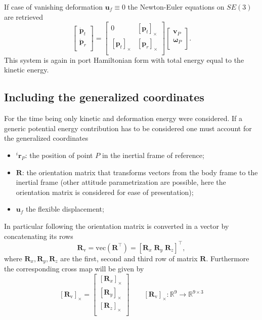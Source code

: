 \documentclass{svjour3}                     %
\newcommand{\crmat}[1]{\ensuremath{[#1]_{\times}}}
\begin{document}
\begin{remark}
If case of vanishing deformation $\bm{u}_f \equiv 0$ the Newton-Euler equations on $SE(3)$ are retrieved
\begin{equation}
\begin{bmatrix}
\dot{\bm{p}}_t \\ \dot{\bm{p}}_r \\
\end{bmatrix} = 
\begin{bmatrix}
	0 & \crmat{\bm{p}_t}\\
	\crmat{\bm{p}_t} & \crmat{\bm{p}_r} \\
	\end{bmatrix}
\begin{bmatrix}
\bm{v}_P \\ \bm{\omega}_P  \\
\end{bmatrix}.
\end{equation}
This system is again in port Hamiltonian form with total energy equal to the kinetic energy.
\end{remark}
\subsection{Including the generalized coordinates}
For the time being only kinetic and deformation energy were considered. If a generic potential energy contribution has to be considered one must account for the generalized coordinates
\begin{itemize}
	\item $^i \bm{r}_P$: the position of point $P$ in the inertial frame of reference;
	\item $\bm{R}$: the orientation matrix that transforms vectors from the body frame to the inertial frame (other attitude parametrization are possible, here the orientation matrix is considered for ease of presentation);
	\item $\bm{u}_f$ the flexible displacement;
\end{itemize}
In particular following \cite{attitude_ph} the orientation matrix is converted in a vector by concatenating its rows
\begin{equation*}
	\bm{R}_{\text{v}} = \text{vec}(\bm{R}^\top) = [\bm{R}_x \; \bm{R}_y \; \bm{R}_z]^\top,
\end{equation*}
where $\bm{R}_{x}, \bm{R}_{y}, \bm{R}_{z}$ are the first, second and third row of matrix $\bm{R}$. Furthermore the corresponding cross map will be given by
\begin{equation*}
\crmat{\bm{R}_{\text{v}}} = 
\begin{bmatrix}
\crmat{\bm{R}_x} \\
\crmat{\bm{R}_y} \\
\crmat{\bm{R}_z} \\
\end{bmatrix} \qquad 
\crmat{\bm{R}_{\text{v}}} : \mathbb{R}^9 \rightarrow \mathbb{R}^{9 \times 3}
\end{equation*}
\end{document}
